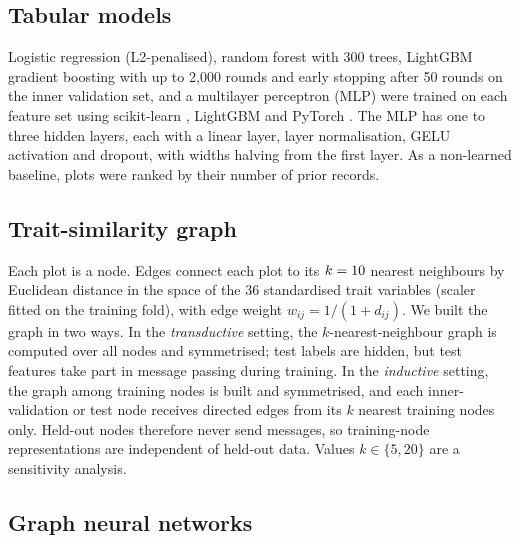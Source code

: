 \documentclass[a4paper,fleqn]{cas-sc}
\begin{document}
\subsection{Tabular models}

Logistic regression (L2-penalised), random forest \citep{breiman2001} with 300 trees, LightGBM gradient boosting \citep{ke2017} with up to 2{,}000 rounds and early stopping after 50 rounds on the inner validation set, and a multilayer perceptron (MLP) were trained on each feature set using scikit-learn \citep{pedregosa2011}, LightGBM and PyTorch \citep{paszke2019}. The MLP has one to three hidden layers, each with a linear layer, layer normalisation, GELU activation and dropout, with widths halving from the first layer. As a non-learned baseline, plots were ranked by their number of prior records.

\subsection{Trait-similarity graph}

Each plot is a node. Edges connect each plot to its $k = 10$ nearest neighbours by Euclidean distance in the space of the 36 standardised trait variables (scaler fitted on the training fold), with edge weight $w_{ij} = 1/(1 + d_{ij})$. We built the graph in two ways. In the \emph{transductive} setting, the $k$-nearest-neighbour graph is computed over all nodes and symmetrised; test labels are hidden, but test features take part in message passing during training. In the \emph{inductive} setting, the graph among training nodes is built and symmetrised, and each inner-validation or test node receives directed edges from its $k$ nearest training nodes only. Held-out nodes therefore never send messages, so training-node representations are independent of held-out data. Values $k \in \{5, 20\}$ are a sensitivity analysis.

\subsection{Graph neural networks}
\end{document}
